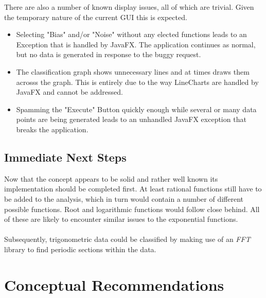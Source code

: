 \documentclass[main.tex]{subfiles}
\begin{document}
      
      
      There are also a number of known display issues, all of which are trivial. Given the temporary nature of the current GUI this is expected.
      \begin{itemize}
        \item Selecting "Bias" and/or "Noise" without any elected functions leads to an Exception that is handled by JavaFX. The application continues as normal, but no data is generated in response to the buggy request.
        \item The classification graph shows unnecessary lines and at times draws them acrosss the graph. This is entirely due to the way LineCharts are handled by JavaFX and cannot be addressed.
        \item Spamming the "Execute" Button quickly enough while several or many data points are being generated leads to an unhandled JavaFX exception that breaks the application.
      \end{itemize}
      
    \subsection{Immediate Next Steps}
      
      Now that the concept appears to be solid and rather well known its implementation should be completed first. At least rational functions still have to be added to the analysis, which in turn would contain a number of different possible functions. Root and logarithmic functions would follow close behind. All of these are likely to encounter similar issues to the exponential functions.
      \\\\
      Subsequently, trigonometric data could be classified by making use of an \textit{FFT} library to find periodic sections within the data. 
        
  \section{Conceptual Recommendations}
    
\end{document}
